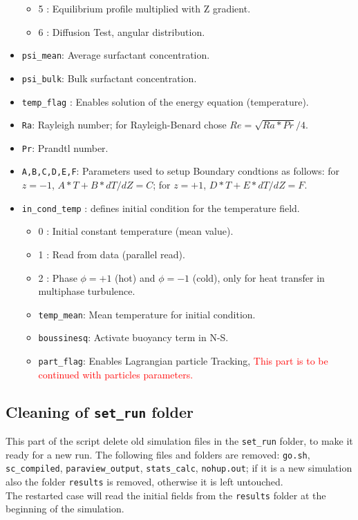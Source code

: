\begin{itemize}
\begin{itemize}[label={$\circ$}]
\item 5 : Equilibrium profile multiplied with Z gradient.
\item 6 : Diffusion Test, angular distribution.
\end{itemize}
\item \texttt{psi\_mean}: Average surfactant concentration.
\item \texttt{psi\_bulk}: Bulk surfactant concentration.
\item \texttt{temp\_flag} : Enables solution of the energy equation (temperature).
\item \texttt{Ra}: Rayleigh number; for Rayleigh-Benard chose $Re=\sqrt{Ra*Pr}/4$.
\item \texttt{Pr}: Prandtl number.
\item \texttt{A,B,C,D,E,F}: Parameters used to setup Boundary condtions as follows: for $z=-1$, $A*T + B*dT/dZ=C$; for $z=+1$, $D*T + E*dT/dZ=F$. 
\item \texttt{in\_cond\_temp} : defines initial condition for the temperature field.
\begin{itemize}[label={$\circ$}]
\item 0 : Initial constant temperature (mean value).
\item 1 : Read from data (parallel read).
\item 2 : Phase $\phi=+1$ (hot) and $\phi=-1$ (cold), only for heat transfer in multiphase turbulence.
\item \texttt{temp\_mean}: Mean temperature for initial condition.
\item \texttt{boussinesq}: Activate buoyancy term in N-S.
\item \texttt{part\_flag}: Enables Lagrangian particle Tracking, \textcolor{red}{This part is to be continued with particles parameters.}
\end{itemize}
\end{itemize}

\subsection{Cleaning of \texttt{set\_run} folder}
\label{sec: restart}
This part of the script delete old simulation files in the \texttt{set\_run} folder, to make it ready for a new run. The following files and folders are removed: \texttt{go.sh}, \texttt{sc\_compiled}, \texttt{paraview\_output}, \texttt{stats\_calc}, \texttt{nohup.out}; if it is a new simulation also the folder \texttt{results} is removed, otherwise it is left untouched.\\
The restarted case will read the initial fields from the \texttt{results} folder at the beginning of the simulation.

